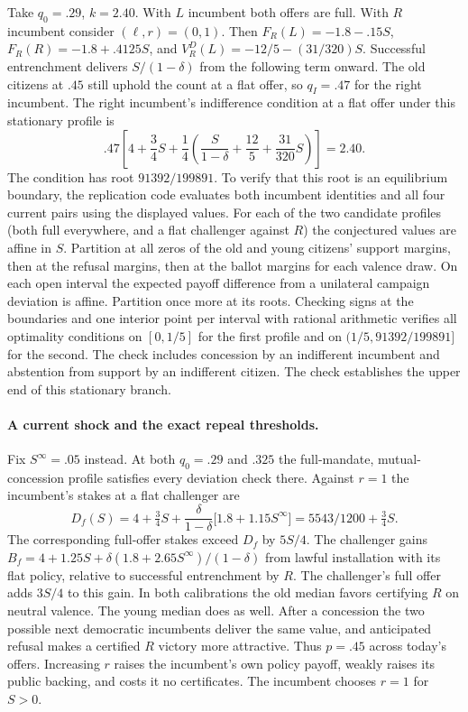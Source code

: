 \documentclass[11pt,letterpaper]{article}
\begin{document}
Take $q_0=.29$, $k=2.40$. With $L$ incumbent both offers are full. With $R$ incumbent consider $(\ell,r)=(0,1)$. Then $F_R(L)=-1.8-.15 S$, $F_R(R)=-1.8+.4125 S$, and $V_R^D(L)=-12/5-(31/320)S$. Successful entrenchment delivers $S/(1-\delta)$ from the following term onward. The old citizens at $.45$ still uphold the count at a flat offer, so $q_I=.47$ for the right incumbent. The right incumbent's indifference condition at a flat offer under this stationary profile is
\[
 .47\left[4+\frac34 S+
 \frac14\left(\frac{S}{1-\delta}+\frac{12}{5}+\frac{31}{320}S\right)\right]=2.40.
\]
The condition has root $91392/199891$. To verify that this root is an equilibrium boundary, the replication code evaluates both incumbent identities and all four current pairs using the displayed values. For each of the two candidate profiles (both full everywhere, and a flat challenger against $R$) the conjectured values are affine in $S$. Partition at all zeros of the old and young citizens' support margins, then at the refusal margins, then at the ballot margins for each valence draw. On each open interval the expected payoff difference from a unilateral campaign deviation is affine. Partition once more at its roots. Checking signs at the boundaries and one interior point per interval with rational arithmetic verifies all optimality conditions on $[0,1/5]$ for the first profile and on $(1/5,91392/199891]$ for the second. The check includes concession by an indifferent incumbent and abstention from support by an indifferent citizen. The check establishes the upper end of this stationary branch.

\paragraph{A current shock and the exact repeal thresholds.}
Fix $S^\infty=.05$ instead. At both $q_0=.29$ and $.325$ the full-mandate, mutual-concession profile satisfies every deviation check there. Against $r=1$ the incumbent's stakes at a flat challenger are
\[
 D_f(S)=4+\tfrac34S+\frac{\delta}{1-\delta}\big[1.8+1.15 S^\infty\big]
       =5543/1200+\tfrac34 S .
\]
The corresponding full-offer stakes exceed $D_f$ by $5S/4$. The challenger gains $B_f=4+1.25S+\delta(1.8+2.65S^\infty)/(1-\delta)$ from lawful installation with its flat policy, relative to successful entrenchment by $R$. The challenger's full offer adds $3S/4$ to this gain. In both calibrations the old median favors certifying $R$ on neutral valence. The young median does as well. After a concession the two possible next democratic incumbents deliver the same value, and anticipated refusal makes a certified $R$ victory more attractive. Thus $p=.45$ across today's offers. Increasing $r$ raises the incumbent's own policy payoff, weakly raises its public backing, and costs it no certificates. The incumbent chooses $r=1$ for $S>0$.
\end{document}
